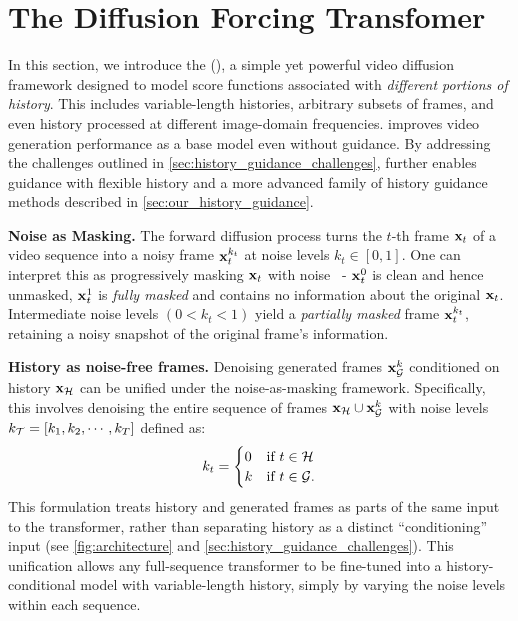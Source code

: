 \section{The Diffusion Forcing Transfomer}
\label{sec:dft}


In this section, we introduce the \method (\mtd), a simple yet powerful video diffusion framework designed to model score functions associated with \emph{different portions of history}. This includes variable-length histories, arbitrary subsets of frames, and even history processed at different image-domain frequencies. \mtd improves video generation performance as a base model even without guidance. By addressing the challenges outlined in \cref{sec:history_guidance_challenges}, \mtd further enables guidance with flexible history and a more advanced family of history guidance methods described in \cref{sec:our_history_guidance}.

 \textbf{Noise as Masking.}
The forward diffusion process turns the $t$-th frame ${\mathbf{x}}_t$ of a video sequence into a noisy frame ${\mathbf{x}_t^{k_t}}$ at noise levels $k_t \in [0, 1]$.
 One can interpret this as progressively masking ${\mathbf{x}}_t$ with noise~\cite{chen2024diffusion} - ${\mathbf{x}}_t^0$ is clean and hence unmasked, ${\mathbf{x}}_t^1$ is \emph{fully masked} and contains no information about the original ${\mathbf{x}}_t$. Intermediate noise levels $(0 < k_t < 1)$ yield a \emph{partially masked} frame ${\mathbf{x}_t^{k_t}}$,  retaining a noisy snapshot of the original frame's information.

\textbf{History as noise-free frames.} Denoising generated frames ${\mathbf{x}_{\mathcal{G}}^{k}}$ conditioned on history ${\mathbf{x}_{\mathcal{H}}}$ can be unified under the noise-as-masking framework. Specifically, this involves denoising the entire sequence of frames ${\mathbf{x}_{\mathcal{H}}} \cup {\mathbf{x}_{\mathcal{G}}^{k}}$ with noise levels $k_{{\mathcal{T}}} = \left[k_1, k_2, \cdots, k_T\right]$ defined as:
\vspace{-0.09in}
\begin{equation}
    k_t = 
    \begin{cases} 
    0 & \text{if } t \in \cH \\
    k & \text{if } t \in \cG. \\
    \end{cases}
    \vspace{-5pt}
\label{eqn:history_as_clean}
\end{equation}
This formulation treats history and generated frames as parts of the same input to the transformer, rather than separating history as a distinct ``conditioning'' input (see \cref{fig:architecture} and \cref{sec:history_guidance_challenges}). This unification allows any full-sequence transformer to be fine-tuned into a history-conditional model with variable-length history, simply by varying the noise levels within each sequence.

